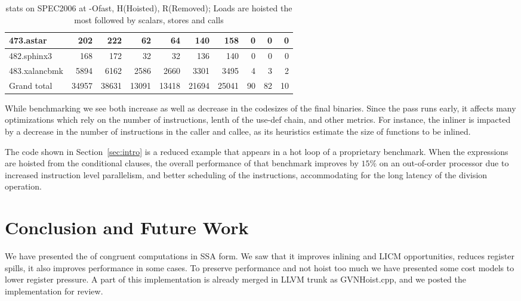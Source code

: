\documentclass[acmlarge,review,anonymous]{acmart}\settopmatter{printfolios=true}
\begin{document}
\begin{table}[h!]
\begin{center}
\begin{tabular}{|l|r|r|r|r|r|r|r|r|r|}
 473.astar	  &  202	& 222	  &  62	  & 64	   & 140	& 158		& 0	& 0	& 0		\\\hline
 482.sphinx3	  &  168	& 172	  &  32	  & 32	   & 136	& 140		& 0	& 0	& 0		\\\hline
 483.xalancbmk	  &  5894	& 6162	  &  2586 & 2660   & 3301	& 3495		& 4	& 3	& 2	        \\\hline
 Grand total      &34957	&38631	  &13091  &13418   &21694	&25041	        &90	&82     &10             \\\hline
    \end{tabular}
  \end{center}
  \caption{\GCM{} stats on SPEC2006 at -Ofast, H(Hoisted), R(Removed); Loads are hoisted the most followed by scalars, stores and calls}
  \label{tab:code-motion-metric}
\end{table}


While benchmarking \SPEC{} we see both increase as well as decrease in
the codesizes of the final binaries. Since the pass runs early, it affects many
optimizations which rely on the number of instructions, lenth of the use-def
chain, and other metrics. For instance, the inliner is impacted by a decrease in
the number of instructions in the caller and callee, as its heuristics estimate
the size of functions to be inlined.

The code shown in Section~\ref{sec:intro} is a reduced example that appears in a
hot loop of a proprietary benchmark.  When the expressions are hoisted from the
conditional clauses, the overall performance of that benchmark improves by
$15\%$ on an out-of-order processor due to increased instruction level
parallelism, and better scheduling of the instructions, accommodating for the
long latency of the division operation.

\section{Conclusion and Future Work}
\label{sec:future-work}
We have presented the \gcm{} of congruent computations in SSA form. We saw that
it improves inlining and LICM opportunities, reduces register spills, it also
improves performance in some cases. To preserve performance and not hoist too
much we have presented some cost models to lower register pressure. A part of
this implementation is already merged in LLVM trunk as GVNHoist.cpp, and we
posted the \GCM{} implementation for review.
\end{document}

